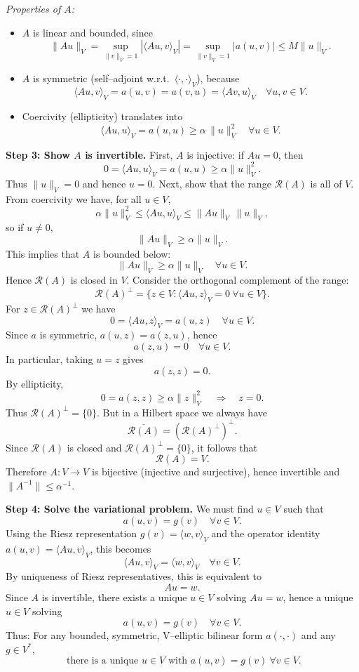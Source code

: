 \emph{Properties of $A$:}
\begin{itemize}
  \item $A$ is linear and bounded, since
        \[
          \|Au\|_V
          = \sup_{\|v\|_V=1} |\langle Au,v\rangle_V|
          = \sup_{\|v\|_V=1} |a(u,v)|
          \le M \|u\|_V.
        \]
  \item $A$ is symmetric (self--adjoint w.r.t.\ $\langle\cdot,\cdot\rangle_V$), because
        \[
          \langle Au,v\rangle_V = a(u,v) = a(v,u) = \langle Av,u\rangle_V
          \quad\forall u,v\in V.
        \]
  \item Coercivity (ellipticity) translates into
        \[
          \langle Au,u\rangle_V = a(u,u) \ge \alpha\,\|u\|_V^2 \quad\forall u\in V.
        \]
\end{itemize}
\textbf{Step 3: Show $A$ is invertible.}
First, $A$ is injective: if $Au=0$, then
\[
  0 = \langle Au,u\rangle_V = a(u,u) \ge \alpha\|u\|_V^2.
\]
Thus $\|u\|_V=0$ and hence $u=0$.
Next, show that the range $\mathcal{R}(A)$ is all of $V$.
From coercivity we have, for all $u\in V$,
\[
  \alpha\|u\|_V^2 \le \langle Au,u\rangle_V \le \|Au\|_V\,\|u\|_V,
\]
so if $u\neq 0$,
\[
  \|Au\|_V \ge \alpha\|u\|_V.
\]
This implies that $A$ is bounded below:
\[
  \|Au\|_V \ge \alpha\|u\|_V \quad\forall u\in V.
\]
Hence $\mathcal{R}(A)$ is closed in $V$.
Consider the orthogonal complement of the range:
\[
  \mathcal{R}(A)^\perp
  = \{ z\in V : \langle Au,z\rangle_V = 0 \ \forall u\in V\}.
\]
For $z\in \mathcal{R}(A)^\perp$ we have
\[
  0 = \langle Au,z\rangle_V = a(u,z) \quad\forall u\in V.
\]
Since $a$ is symmetric, $a(u,z) = a(z,u)$, hence
\[
  a(z,u) = 0 \quad\forall u\in V.
\]
In particular, taking $u=z$ gives
\[
  a(z,z) = 0.
\]
By ellipticity,
\[
  0 = a(z,z) \ge \alpha\|z\|_V^2 \quad\Rightarrow\quad z=0.
\]
Thus $\mathcal{R}(A)^\perp = \{0\}$.
But in a Hilbert space we always have
\[
  \overline{\mathcal{R}(A)} = (\mathcal{R}(A)^\perp)^\perp.
\]
Since $\mathcal{R}(A)$ is closed and $\mathcal{R}(A)^\perp = \{0\}$, it follows that
\[
  \mathcal{R}(A) = V.
\]
Therefore $A:V\to V$ is bijective (injective and surjective), hence invertible and
$\|A^{-1}\| \le \alpha^{-1}$.

\textbf{Step 4: Solve the variational problem.}
We must find $u\in V$ such that
\[
  a(u,v) = g(v) \quad\forall v\in V.
\]
Using the Riesz representation $g(v) = \langle w,v\rangle_V$ and the operator identity
$a(u,v) = \langle Au,v\rangle_V$, this becomes
\[
  \langle Au,v\rangle_V = \langle w,v\rangle_V \quad\forall v\in V.
\]
By uniqueness of Riesz representatives, this is equivalent to
\[
  Au = w.
\]
Since $A$ is invertible, there exists a unique $u\in V$ solving $Au=w$, hence a unique
$u\in V$ solving
\[
  a(u,v) = g(v)\quad\forall v\in V.
\]
Thus: For any bounded, symmetric, V--elliptic bilinear form $a(\cdot,\cdot)$ and any $g \in V^\ast$,
\[
  \boxed{
    \text{ there is a unique } u\in V \text{ with } a(u,v)=g(v)\ \forall v \in V.
  }
\]

